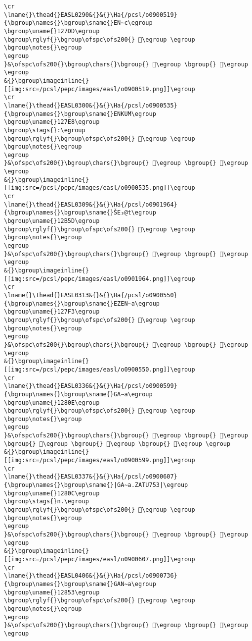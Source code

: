 \begin{verbatim}
\cr
\lname{}\thead{}EASL0290&{}&{}\Ha{/pcsl/o0900519}{\bgroup\names{}\bgroup\sname{}EN∼c\egroup
\bgroup\uname{}127DD\egroup
\bgroup\rglyf{}\bgroup\ofspc\ofs200{} 𒟝\egroup \egroup
\bgroup\notes{}\egroup
\egroup
}&\ofspc\ofs200{}\bgroup\chars{}\bgroup{} 𒟝\egroup \bgroup{} 𒟟\egroup \egroup
&{}\bgroup\imageinline{}[[img:src=/pcsl/pepc/images/easl/o0900519.png]]\egroup
\cr
\lname{}\thead{}EASL0300&{}&{}\Ha{/pcsl/o0900535}{\bgroup\names{}\bgroup\sname{}ENKUM\egroup
\bgroup\uname{}127E8\egroup
\bgroup\stags{}:\egroup
\bgroup\rglyf{}\bgroup\ofspc\ofs200{} 𒟨\egroup \egroup
\bgroup\notes{}\egroup
\egroup
}&\ofspc\ofs200{}\bgroup\chars{}\bgroup{} 𒟨\egroup \bgroup{} 𒟩\egroup \egroup
&{}\bgroup\imageinline{}[[img:src=/pcsl/pepc/images/easl/o0900535.png]]\egroup
\cr
\lname{}\thead{}EASL0309&{}&{}\Ha{/pcsl/o0901964}{\bgroup\names{}\bgroup\sname{}ŠE₃@t\egroup
\bgroup\uname{}12B5D\egroup
\bgroup\rglyf{}\bgroup\ofspc\ofs200{} 𒭝\egroup \egroup
\bgroup\notes{}\egroup
\egroup
}&\ofspc\ofs200{}\bgroup\chars{}\bgroup{} 𒭛\egroup \bgroup{} 𒭝\egroup \egroup
&{}\bgroup\imageinline{}[[img:src=/pcsl/pepc/images/easl/o0901964.png]]\egroup
\cr
\lname{}\thead{}EASL0313&{}&{}\Ha{/pcsl/o0900550}{\bgroup\names{}\bgroup\sname{}EZEN∼a\egroup
\bgroup\uname{}127F3\egroup
\bgroup\rglyf{}\bgroup\ofspc\ofs200{} 𒟳\egroup \egroup
\bgroup\notes{}\egroup
\egroup
}&\ofspc\ofs200{}\bgroup\chars{}\bgroup{} 𒠁\egroup \bgroup{} 𒟳\egroup \egroup
&{}\bgroup\imageinline{}[[img:src=/pcsl/pepc/images/easl/o0900550.png]]\egroup
\cr
\lname{}\thead{}EASL0336&{}&{}\Ha{/pcsl/o0900599}{\bgroup\names{}\bgroup\sname{}GA∼a\egroup
\bgroup\uname{}1280E\egroup
\bgroup\rglyf{}\bgroup\ofspc\ofs200{} 𒠎\egroup \egroup
\bgroup\notes{}\egroup
\egroup
}&\ofspc\ofs200{}\bgroup\chars{}\bgroup{} 𒠊\egroup \bgroup{} 𒠋\egroup \bgroup{} 𒠍\egroup \bgroup{} 𒠎\egroup \bgroup{} 𒠏\egroup \egroup
&{}\bgroup\imageinline{}[[img:src=/pcsl/pepc/images/easl/o0900599.png]]\egroup
\cr
\lname{}\thead{}EASL0337&{}&{}\Ha{/pcsl/o0900607}{\bgroup\names{}\bgroup\sname{}|GA∼a.ZATU753|\egroup
\bgroup\uname{}1280C\egroup
\bgroup\stags{}n.\egroup
\bgroup\rglyf{}\bgroup\ofspc\ofs200{} 𒠌\egroup \egroup
\bgroup\notes{}\egroup
\egroup
}&\ofspc\ofs200{}\bgroup\chars{}\bgroup{} 𒠌\egroup \bgroup{} 𒠐\egroup \egroup
&{}\bgroup\imageinline{}[[img:src=/pcsl/pepc/images/easl/o0900607.png]]\egroup
\cr
\lname{}\thead{}EASL0406&{}&{}\Ha{/pcsl/o0900736}{\bgroup\names{}\bgroup\sname{}GAN∼a\egroup
\bgroup\uname{}12853\egroup
\bgroup\rglyf{}\bgroup\ofspc\ofs200{} 𒡓\egroup \egroup
\bgroup\notes{}\egroup
\egroup
}&\ofspc\ofs200{}\bgroup\chars{}\bgroup{} 𒡒\egroup \bgroup{} 𒡓\egroup \egroup

\end{verbatim}
